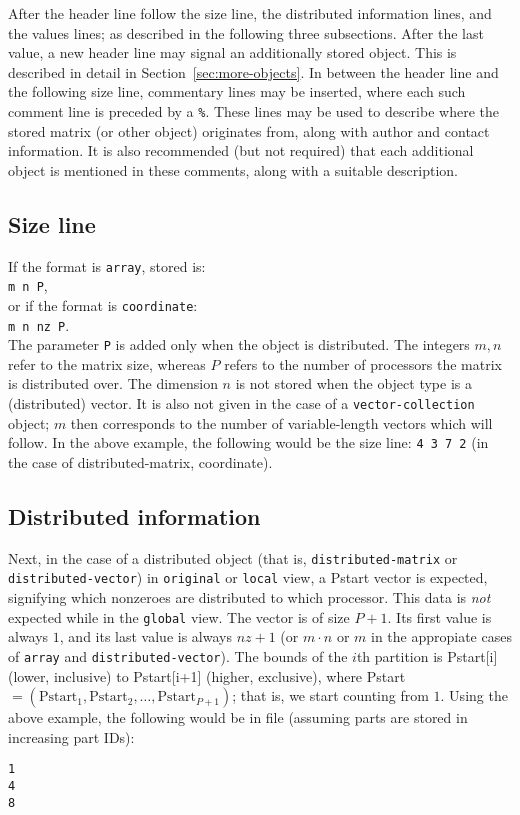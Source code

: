 \documentclass[final]{amsart}
\begin{document}
After the header line follow the size line,
the distributed information lines,
and the values lines;
as described in the following three subsections.
After the last value, a new header line may signal an additionally stored object.
This is described in detail in Section~\ref{sec:more-objects}.
In between the header line and the following size line,
commentary lines may be inserted,
where each such comment line is preceded by a \verb|%|.
These lines may be used to describe where the stored matrix (or other object) originates from,
along with author and contact information.
It is also recommended (but not required) that each additional object is mentioned in these comments,
along with a suitable description.

\subsection{Size line}

If the format is \verb|array|, stored is:\\
\verb|m n P|,\\
or if the format is \verb|coordinate|:\\
\verb|m n nz P|.\\
The parameter \verb|P| is added only when the object is distributed.
The integers $m,n$ refer to the matrix size, whereas $P$ refers to the number of processors the matrix is distributed over.
The dimension $n$ is not stored when the object type is a (distributed) vector.
It is also not given in the case of a \verb|vector-collection| object;
$m$ then corresponds to the number of variable-length vectors which will follow.
In the above example, the following would be the size line:
\verb|4 3 7 2| (in the case of distributed-matrix, coordinate).

\subsection{Distributed information}

Next, in the case of a distributed object (that is, \verb|distributed-matrix| or \verb|distributed-vector|) in \verb|original| or \verb|local| view,
a Pstart vector is expected,
signifying which nonzeroes are distributed to which processor.
This data is \emph{not} expected while in the \verb|global| view.
The vector is of size $P+1$.
Its first value is always $1$,
and its last value is always $nz+1$
(or $m\cdot n$ or $m$ in the appropiate cases of \verb|array| and \verb|distributed-vector|).
The bounds of the $i$th partition is
Pstart[i] (lower, inclusive)
to Pstart[i+1] (higher, exclusive),
where Pstart$=(\text{Pstart}_1,\text{Pstart}_2,\dots,\text{Pstart}_{P+1})$;
that is, we start counting from $1$.
Using the above example, the following would be in file (assuming parts are stored in increasing part IDs):
\begin{verbatim}
1
4
8
\end{verbatim}
\end{document}
